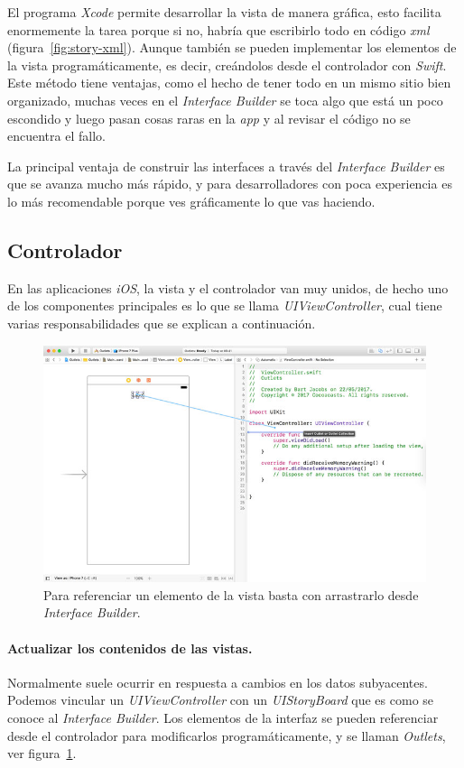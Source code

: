 El programa \textit{Xcode} permite desarrollar la vista de manera gráfica, esto facilita enormemente la tarea porque si no, habría que escribirlo todo en código \textit{xml} (figura~\ref{fig:story-xml}).
Aunque también se pueden implementar los elementos de la vista programáticamente, es decir, creándolos desde el controlador con \textit{Swift}. Este método tiene ventajas, como el hecho de tener todo en un mismo sitio bien organizado, muchas veces en el \textit{Interface Builder} se toca algo que está un poco escondido y luego pasan cosas raras en la \textit{app} y al revisar el código no se encuentra el fallo.

La principal ventaja de construir las interfaces a través del \textit{Interface Builder} es que se avanza mucho más rápido, y para desarrolladores con poca experiencia es lo más recomendable porque ves gráficamente lo que vas haciendo.

\subsection{Controlador}
En las aplicaciones \textit{iOS}, la vista y el controlador van muy unidos, de hecho uno de los componentes principales es lo que se llama \textit{UIViewController}, cual tiene varias responsabilidades que se explican a continuación.

\begin{figure}[t]
\centering
\includegraphics[scale=0.4]{figures/outlets.jpg}
\caption{Para referenciar un elemento de la vista basta con arrastrarlo desde \textit{Interface Builder}.\label{fig:outlets}}
\end{figure}


\paragraph{Actualizar los contenidos de las vistas.} Normalmente suele ocurrir en respuesta a cambios en los datos subyacentes. Podemos vincular un \textit{UIViewController} con un \textit{UIStoryBoard} que es como se conoce al \textit{Interface Builder}. Los elementos de la interfaz se pueden referenciar desde el controlador para modificarlos programáticamente, y se llaman \textit{Outlets}, ver figura~\ref{fig:outlets}.

